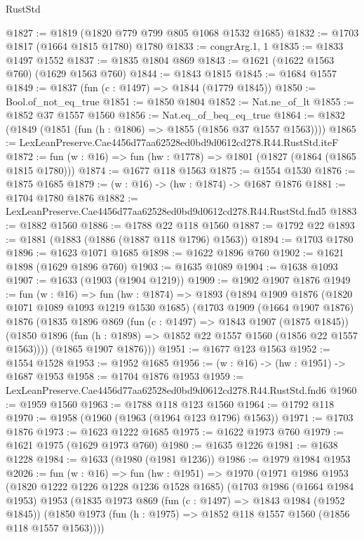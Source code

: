 \begin{lexlean}{RustStd}
\begin{coremodule}
@1827 := @1819 (@1820 @779 @799 @805 @1068 @1532 @1685)
@1832 := @1703 @1817 (@1664 @1815 @1780) @1780
@1833 := congrArg.{1, 1}
@1835 := @1833 @1497 @1552
@1837 := @1835 @1804 @869
@1843 := @1621 (@1622 @1563 @760) (@1629 @1563 @760)
@1844 := @1843 @1815
@1845 := @1684 @1557
@1849 := @1837 (fun (c : @1497) => @1844 (@1779 @1845))
@1850 := Bool.of_not_eq_true
@1851 := @1850 @1804
@1852 := Nat.ne_of_lt
@1855 := @1852 @37 @1557 @1560
@1856 := Nat.eq_of_beq_eq_true
@1864 := @1832 (@1849 (@1851 (fun (h : @1806) => @1855 (@1856 @37 @1557 @1563))))
@1865 := LexLeanPreserve.Cae4456d77aa62528ed0bd9d0612cd278.R44.RustStd.iteF
@1872 := fun (w : @16) => fun (hw : @1778) => @1801 (@1827 (@1864 (@1865 @1815 @1780)))
@1874 := @1677 @118 @1563
@1875 := @1554 @1530
@1876 := @1875 @1685
@1879 := (w : @16) -> (hw : @1874) -> @1687 @1876
@1881 := @1704 @1780 @1876
@1882 := LexLeanPreserve.Cae4456d77aa62528ed0bd9d0612cd278.R44.RustStd.fnd5
@1883 := @1882 @1560
@1886 := @1788 @22 @118 @1560
@1887 := @1792 @22
@1893 := @1881 (@1883 (@1886 (@1887 @118 @1796) @1563))
@1894 := @1703 @1780
@1896 := @1623 @1071 @1685
@1898 := @1622 @1896 @760
@1902 := @1621 @1898 (@1629 @1896 @760)
@1903 := @1635 @1089
@1904 := @1638 @1093
@1907 := @1633 (@1903 (@1904 @1219))
@1909 := @1902 @1907 @1876
@1949 := fun (w : @16) =>
  fun (hw : @1874) =>
  @1893
    (@1894
      @1909
      @1876
      (@1820 @1071 @1089 @1093 @1219 @1530 @1685)
      (@1703
        @1909
        (@1664 @1907 @1876)
        @1876
        (@1835
          @1896
          @869
          (fun (c : @1497) => @1843 @1907 (@1875 @1845))
          (@1850 @1896 (fun (h : @1898) => @1852 @22 @1557 @1560 (@1856 @22 @1557 @1563))))
        (@1865 @1907 @1876)))
@1951 := @1677 @123 @1563
@1952 := @1554 @1528
@1953 := @1952 @1685
@1956 := (w : @16) -> (hw : @1951) -> @1687 @1953
@1958 := @1704 @1876 @1953
@1959 := LexLeanPreserve.Cae4456d77aa62528ed0bd9d0612cd278.R44.RustStd.fnd6
@1960 := @1959 @1560
@1963 := @1788 @118 @123 @1560
@1964 := @1792 @118
@1970 := @1958 (@1960 (@1963 (@1964 @123 @1796) @1563))
@1971 := @1703 @1876
@1973 := @1623 @1222 @1685
@1975 := @1622 @1973 @760
@1979 := @1621 @1975 (@1629 @1973 @760)
@1980 := @1635 @1226
@1981 := @1638 @1228
@1984 := @1633 (@1980 (@1981 @1236))
@1986 := @1979 @1984 @1953
@2026 := fun (w : @16) =>
  fun (hw : @1951) =>
  @1970
    (@1971
      @1986
      @1953
      (@1820 @1222 @1226 @1228 @1236 @1528 @1685)
      (@1703
        @1986
        (@1664 @1984 @1953)
        @1953
        (@1835
          @1973
          @869
          (fun (c : @1497) => @1843 @1984 (@1952 @1845))
          (@1850 @1973 (fun (h : @1975) => @1852 @118 @1557 @1560 (@1856 @118 @1557 @1563))))

\end{coremodule}
\end{lexlean}

